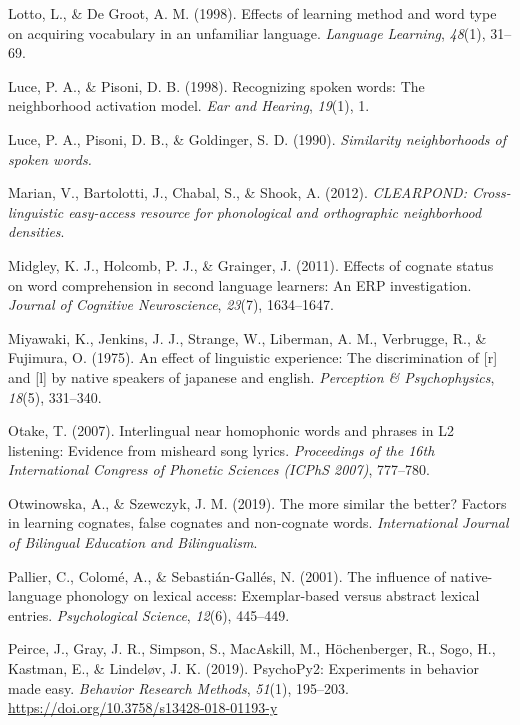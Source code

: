 \documentclass[
]{article}
\newlength{\cslhangindent}
\newenvironment{CSLReferences}[2] %
 {\begin{list}{}{%
  \setlength{\itemindent}{0pt}
  \setlength{\leftmargin}{0pt}
  \setlength{\parsep}{0pt}
  \ifodd #1
   \setlength{\leftmargin}{\cslhangindent}
   \setlength{\itemindent}{-1\cslhangindent}
  \fi
  \setlength{\itemsep}{#2\baselineskip}}}
 {\end{list}}
\begin{document}
\begin{CSLReferences}{1}{0}
Lotto, L., \& De Groot, A. M. (1998). Effects of learning method and
word type on acquiring vocabulary in an unfamiliar language.
\emph{Language Learning}, \emph{48}(1), 31--69.

Luce, P. A., \& Pisoni, D. B. (1998). Recognizing spoken words: {The}
neighborhood activation model. \emph{Ear and Hearing}, \emph{19}(1), 1.

Luce, P. A., Pisoni, D. B., \& Goldinger, S. D. (1990). \emph{Similarity
neighborhoods of spoken words.}

Marian, V., Bartolotti, J., Chabal, S., \& Shook, A. (2012).
\emph{{CLEARPOND}: {Cross-linguistic} easy-access resource for
phonological and orthographic neighborhood densities}.

Midgley, K. J., Holcomb, P. J., \& Grainger, J. (2011). Effects of
cognate status on word comprehension in second language learners: {An
ERP} investigation. \emph{Journal of Cognitive Neuroscience},
\emph{23}(7), 1634--1647.

Miyawaki, K., Jenkins, J. J., Strange, W., Liberman, A. M., Verbrugge,
R., \& Fujimura, O. (1975). An effect of linguistic experience: The
discrimination of {[}r{]} and {[}l{]} by native speakers of japanese and
english. \emph{Perception \& Psychophysics}, \emph{18}(5), 331--340.

Otake, T. (2007). Interlingual near homophonic words and phrases in L2
listening: Evidence from misheard song lyrics. \emph{Proceedings of the
16th International Congress of Phonetic Sciences (ICPhS 2007)},
777--780.

Otwinowska, A., \& Szewczyk, J. M. (2019). The more similar the better?
Factors in learning cognates, false cognates and non-cognate words.
\emph{International Journal of Bilingual Education and Bilingualism}.

Pallier, C., Colomé, A., \& Sebastián-Gallés, N. (2001). The influence
of native-language phonology on lexical access: Exemplar-based versus
abstract lexical entries. \emph{Psychological Science}, \emph{12}(6),
445--449.

Peirce, J., Gray, J. R., Simpson, S., MacAskill, M., Höchenberger, R.,
Sogo, H., Kastman, E., \& Lindeløv, J. K. (2019). {PsychoPy2}:
{Experiments} in behavior made easy. \emph{Behavior Research Methods},
\emph{51}(1), 195--203. \url{https://doi.org/10.3758/s13428-018-01193-y}


\end{CSLReferences}
\end{document}
